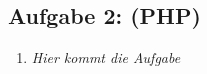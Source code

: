 \subsection{Aufgabe 2: (PHP)}
\label{sec:Aufgabe2}
\begin{enumerate}[label=\alph*)]
    \item \textit{Hier kommt die Aufgabe}
\end{enumerate}